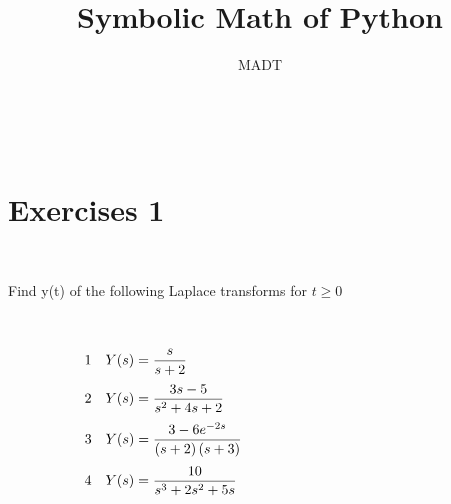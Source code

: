 \documentclass[10pt,a4paper,leqno]{article}
\begin{document}
                              
\author{MADT}                           
\title{Symbolic Math of Python}                             
\maketitle

\noindent \begin{CJK*}{UTF8}{gbsn}
 \par \ \par\noindent \section{Exercises 1}
 \par \ \par\noindent Find y(t) of the following Laplace transforms for $t \ge 0$
 \par \ \par\begin{equation*}
 \begin{minipage}{250pt}
                \begin{flushleft} 1\quad$\displaystyle Y{\left(s \right)} = \frac{s}{s + 2}$  \end{flushleft}
 \end{minipage}
 \end{equation*}
\begin{equation*}
 \begin{minipage}{250pt}
                \begin{flushleft} 2\quad$\displaystyle Y{\left(s \right)} = \frac{3 s - 5}{s^{2} + 4 s + 2}$  \end{flushleft}
 \end{minipage}
 \end{equation*}
\begin{equation*}
 \begin{minipage}{250pt}
                \begin{flushleft} 3\quad$\displaystyle Y{\left(s \right)} = \frac{3 - 6 e^{- 2 s}}{\left(s + 2\right) \left(s + 3\right)}$  \end{flushleft}
 \end{minipage}
 \end{equation*}
\begin{equation*}
 \begin{minipage}{250pt}
                \begin{flushleft} 4\quad$\displaystyle Y{\left(s \right)} = \frac{10}{s^{3} + 2 s^{2} + 5 s}$  \end{flushleft}

\end{minipage}
\end{equation*}
\end{CJK*}
\end{document}
